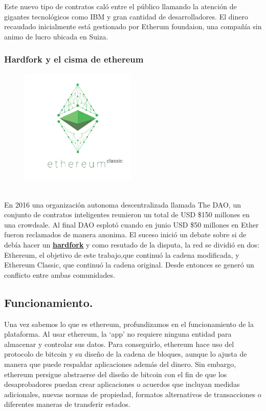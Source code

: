 \documentclass[11pt,a4paper]{article}
\begin{document}
Este nuevo tipo de contratos caló entre el público llamando la atención de gigantes tecnológicos como IBM y gran cantidad de desarrolladores. El dinero recaudado inicialmente está gestionado por Etherum foundaion\footnotemark, una compañía sin animo de lucro ubicada en Suiza.	\\


\subsubsection{Hardfork y el cisma de ethereum}
\begin{figure}
  \caption{\ \ }
  \includegraphics[width=5.5cm]{images/classic1.png}
\end{figure} 
En 2016 una organización autonoma descentralizada llamada The DAO, un conjunto de contratos inteligentes reunieron un total de USD \$150 millones en una crowdsale. Al final DAO esplotó cuando en junio USD \$50 millones en Ether fueron reclamados de manera anonima. El suceso inició un debate sobre si de debía hacer un 
\hyperref[sec:hardfork]{\textbf{\underline{hardfork}}} y como resutado de la disputa, la red se dividió en dos: Ethereum, el objetivo de este trabajo,que continuó la cadena modificada, y Ethereum Classic, que continuó la cadena original. Desde entonces se generó un conflicto entre ambas comunidades.\\


\subsection{Funcionamiento.\\} 
Una vez sabemos lo que es ethereum, profundizamos en el funcionamiento de la plataforma.
Al usar ethereum, la ‘app’ no requiere ninguna entidad para almacenar y controlar sus datos. Para conseguirlo, ethereum hace uso del protocolo de bitcoin y su diseño de la cadena de bloques, aunque lo ajusta de manera que puede respaldar aplicaciones además del dinero. Sin embargo, ethereum persigue abstraerse del diseño de bitcoin con el fin de que los desaprobadores puedan crear aplicaciones o acuerdos que incluyan medidas adicionales, nuevas normas de propiedad, formatos alternativos de transacciones o diferentes maneras de transferir estados.\\
\end{document}

